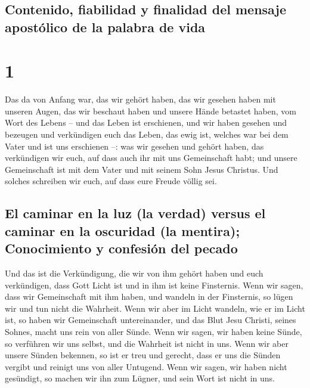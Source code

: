 \hypertarget{contenido-fiabilidad-y-finalidad-del-mensaje-apostuxf3lico-de-la-palabra-de-vida}{%
\subsection{Contenido, fiabilidad y finalidad del mensaje apostólico de
la palabra de
vida}\label{contenido-fiabilidad-y-finalidad-del-mensaje-apostuxf3lico-de-la-palabra-de-vida}}

\hypertarget{section}{%
\section{1}\label{section}}

 Das da von Anfang war, das wir gehört haben, das wir
gesehen haben mit unseren Augen, das wir beschaut haben und unsere Hände
betastet haben, vom Wort des Lebens --  und das Leben ist
erschienen, und wir haben gesehen und bezeugen und verkündigen euch das
Leben, das ewig ist, welches war bei dem Vater und ist uns erschienen
--:  was wir gesehen und gehört haben, das verkündigen wir
euch, auf dass auch ihr mit uns Gemeinschaft habt; und unsere
Gemeinschaft ist mit dem Vater und mit seinem Sohn Jesus Christus.
 Und solches schreiben wir euch, auf dass eure Freude
völlig sei.

\hypertarget{el-caminar-en-la-luz-la-verdad-versus-el-caminar-en-la-oscuridad-la-mentira-conocimiento-y-confesiuxf3n-del-pecado}{%
\subsection{El caminar en la luz (la verdad) versus el caminar en la
oscuridad (la mentira); Conocimiento y confesión del
pecado}\label{el-caminar-en-la-luz-la-verdad-versus-el-caminar-en-la-oscuridad-la-mentira-conocimiento-y-confesiuxf3n-del-pecado}}

 Und das ist die Verkündigung, die wir von ihm gehört
haben und euch verkündigen, dass Gott Licht ist und in ihm ist keine
Finsternis.  Wenn wir sagen, dass wir Gemeinschaft mit ihm
haben, und wandeln in der Finsternis, so lügen wir und tun nicht die
Wahrheit.  Wenn wir aber im Licht wandeln, wie er im Licht
ist, so haben wir Gemeinschaft untereinander, und das Blut Jesu Christi,
seines Sohnes, macht uns rein von aller Sünde.  Wenn wir
sagen, wir haben keine Sünde, so verführen wir uns selbst, und die
Wahrheit ist nicht in uns.  Wenn wir aber unsere Sünden
bekennen, so ist er treu und gerecht, dass er uns die Sünden vergibt und
reinigt uns von aller Untugend.  Wenn wir sagen, wir
haben nicht gesündigt, so machen wir ihn zum Lügner, und sein Wort ist
nicht in uns.


